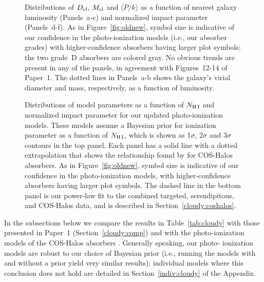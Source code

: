 \documentclass[twocolumn,twocolappendix,tighten,times]{aastex6}
\begin{document}
\begin{figure*}
\caption{Distributions of $D_{\rm cl}$, $M_{\rm cl}$ and $\langle P/k \rangle$ as a function of nearest galaxy luminosity (Panels~a-c) and normalized impact parameter (Panels~d-f). As in Figure~\ref{fig:oldnew}, symbol size is indicative of our confidence in the photo-ionization models (i.e., our absorber grades) with higher-confidence absorbers having larger plot symbols; the two grade~D absorbers are colored gray. No obvious trends are present in any of the panels, in agreement with Figures~12-14 of Paper~1. The dotted lines in Panels~a-b shows the galaxy's virial diameter and mass, respectively, as a function of luminosity.
\label{fig:comp}}
\end{figure*}

\begin{figure}[!t]
\caption{Distributions of model parameters as a function of $N_{\rm H\,I}$ and normalized impact parameter for our updated photo-ionization models. These models assume a Bayesian prior for ionization parameter as a function of $N_{\rm H\,I}$, which is shown as 1$\sigma$, 2$\sigma$ and $3\sigma$ contours in the top panel. Each panel has a solid line with a dotted extrapolation that shows the relationship found by \citet{werk14} for COS-Halos absorbers. As in Figure~\ref{fig:oldnew}, symbol size is indicative of our confidence in the photo-ionization models, with higher-confidence absorbers having larger plot symbols. The dashed line in the bottom panel is our power-law fit to the combined targeted, serendipitous, and COS-Halos data, and is described in Section~\ref{cloudy:coshalos}.
\label{fig:werk}}
\end{figure}


In the subsections below we compare the results in Table~\ref{tab:cloudy} with 
those presented in Paper~1 (Section~\ref{cloudy:comp}) and with the 
photo-ionization models of the COS-Halos absorbers 
\citep[Section~\ref{cloudy:coshalos}]{werk14}. Generally speaking, our photo-
ionization models are robust to our choice of Bayesian prior (i.e., running the 
models with and without a prior yield very similar results); individual models 
where this conclusion does not hold are detailed in Section~\ref{indiv:cloudy} of 
the Appendix.
\end{document}
